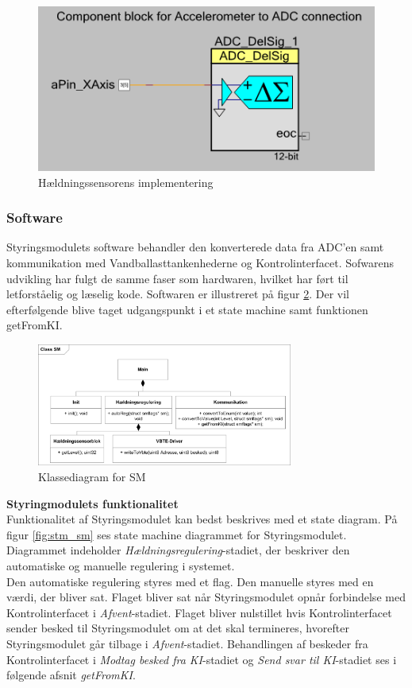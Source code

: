 \begin{figure}[htbp]
	\centering
	\includegraphics[scale=0.8]{billeder/levelsensor}
	\caption{Hældningssensorens implementering}
	\label{fig:levelsensor}
\end{figure}
\subsubsection{Software}
Styringsmodulets software behandler den konverterede data fra ADC'en samt kommunikation med Vandballasttankenhederne og Kontrolinterfacet. Sofwarens udvikling har fulgt de samme faser som hardwaren, hvilket har ført til letforståelig og læselig kode. Softwaren er illustreret på figur \ref{fig:SMKD}. Der vil efterfølgende blive taget udgangspunkt i et state machine samt funktionen getFromKI.
\begin{figure}[H]
	\centering
	\includegraphics[width=0.75\textwidth]{billeder/smKlassediagram}
	\caption{Klassediagram for SM}
	\label{fig:SMKD}
\end{figure}
\textbf{Styringmodulets funktionalitet}\\
Funktionalitet af Styringsmodulet kan bedst beskrives med et state diagram. På figur \ref{fig:stm_sm} ses state machine diagrammet for Styringsmodulet. Diagrammet indeholder \textit{Hældningsregulering}-stadiet, der beskriver den automatiske og manuelle regulering i systemet. \\Den automatiske regulering styres med et flag. Den manuelle styres med en værdi, der bliver sat. Flaget bliver sat når Styringsmodulet opnår forbindelse med Kontrolinterfacet i \textit{Afvent}-stadiet. Flaget bliver nulstillet hvis Kontrolinterfacet sender besked til Styringsmodulet om at det skal termineres, hvorefter Styringsmodulet går tilbage i \textit{Afvent}-stadiet. Behandlingen af beskeder fra Kontrolinterfacet i \textit{Modtag besked fra KI}-stadiet og \textit{Send svar til KI}-stadiet ses i følgende afsnit \textit{getFromKI}.\\
